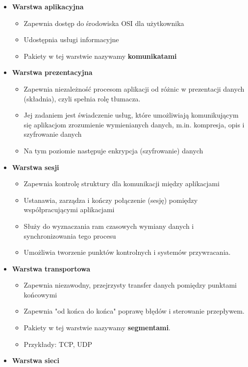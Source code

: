 		\begin{itemize}
			\item \textbf{Warstwa aplikacyjna}
			\begin{itemize}
				\item Zapewnia dostęp do środowiska OSI dla użytkownika
				\item Udostępnia usługi informacyjne
				\item Pakiety w tej warstwie nazywamy \textbf{komunikatami}
			\end{itemize}
			\item \textbf{Warstwa prezentacyjna}
			\begin{itemize}
				\item Zapewnia niezależność procesom aplikacji od różnic w prezentacji danych (składnia), czyli spełnia rolę tłumacza.
				\item Jej zadaniem jest świadczenie usług, które umożliwiają komunikującym się aplikacjom zrozumienie wymienianych danych, m.in. kompresja, opis i szyfrowanie danych
				\item Na tym poziomie następuje enkrypcja (szyfrowanie) danych
			\end{itemize}  
			\item \textbf{Warstwa sesji}
			\begin{itemize}
				\item Zapewnia kontrolę struktury dla komunikacji między aplikacjami
				\item Ustanawia, zarządza i kończy połączenie (sesję) pomiędzy współpracującymi aplikacjami
				\item Służy do wyznaczania ram czasowych wymiany danych i synchronizowania tego procesu
				\item Umożliwia tworzenie punktów kontrolnych i systemów przywracania.
			\end{itemize}
			\item \textbf{Warstwa transportowa}
			\begin{itemize}
				\item Zapewnia niezawodny, przejrzysty transfer danych pomiędzy punktami końcowymi
				\item Zapewnia "od końca do końca" poprawę błędów i sterowanie przepływem.
				\item Pakiety w tej warstwie nazywamy \textbf{segmentami}.
				\item Przykłady: TCP, UDP
			\end{itemize}
			\item \textbf{Warstwa sieci}
			\begin{itemize}

\end{itemize}
\end{itemize}
